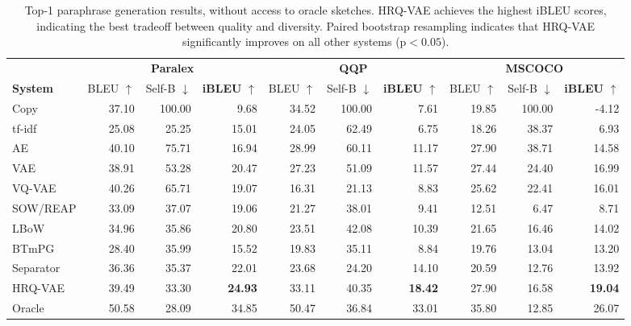 \documentclass[11pt]{article}
\begin{document}
\begin{table*}[ht!]
    \centering
\small
\begin{tabular}{l|rrr|rrr|rrr}
& \multicolumn{3}{c|}{\textbf{Paralex}} & \multicolumn{3}{c|}{\textbf{QQP}} & \multicolumn{3}{c}{\textbf{MSCOCO}} \\
    \textbf{System} & {BLEU} $\uparrow$ & {Self-B} $\downarrow$  & {\textbf{iBLEU}} $\uparrow$  & {BLEU} $\uparrow$  & {Self-B} $\downarrow$ & {\textbf{iBLEU}} $\uparrow$ & {BLEU} $\uparrow$  & {Self-B} $\downarrow$ & {\textbf{iBLEU}} $\uparrow$ \\
\hline \hline
    Copy  & 37.10 & 100.00 & 9.68 & 34.52 & 100.00 & 7.61 & 19.85 & 100.00 & -4.12 \\ 
    \mbox{tf-idf}  & 25.08 & 25.25 & 15.01 & 24.05 & 62.49 & 6.75 & 18.26 & 38.37 & 6.93 \\ 
    AE  & 40.10 & 75.71 & 16.94 & 28.99 & 60.11 & 11.17 & 27.90 &  38.71 & 14.58 \\ 
    VAE  & 38.91 & 53.28 & 20.47 & 27.23 & 51.09 & 11.57 & 27.44 & 24.40 & 16.99 \\ 
    

    VQ-VAE  & 40.26 & 65.71 & 19.07 & 16.31 & 21.13 & 8.83 & 25.62 & 22.41 & 16.01 \\ 
    \hline
SOW/REAP & 33.09 & 37.07 & 19.06 & 21.27 & 38.01 & 9.41 & 12.51 & 6.47 & 8.71 \\ 
    LBoW & 34.96 & 35.86 & 20.80 & 23.51 & 42.08 & 10.39 & 21.65 & 16.46 & 14.02 \\ 
    BTmPG & 28.40 & 35.99 & 15.52 & 19.83 & 35.11 & 8.84 & 19.76 & 13.04 & 13.20 \\

    Separator & 36.36 & 35.37 & 22.01 & 23.68 & 24.20 & 14.10 & 20.59 & 12.76 & 13.92  \\
HRQ-VAE & 39.49 & 33.30 & \textbf{24.93} & 33.11 & 40.35 & \textbf{18.42} &  27.90 & 16.58 & \textbf{19.04}  \\
    \hline 
{Oracle} & 50.58 & 28.09 & 34.85 & 50.47 & 36.84 & 33.01 & 35.80 & 12.85 & 26.07 \\
    
    
    
    \hline \hline
    \end{tabular}
\caption{Top-1 paraphrase generation results, without access to oracle
      sketches. HRQ-VAE achieves the highest iBLEU scores, indicating the best tradeoff between quality and diversity. Paired bootstrap resampling \cite{koehn-2004-statistical} indicates that HRQ-VAE significantly improves on all other systems (p$ < 0.05$).}  
\label{tab:ibleu}
\end{table*}
\end{document}
